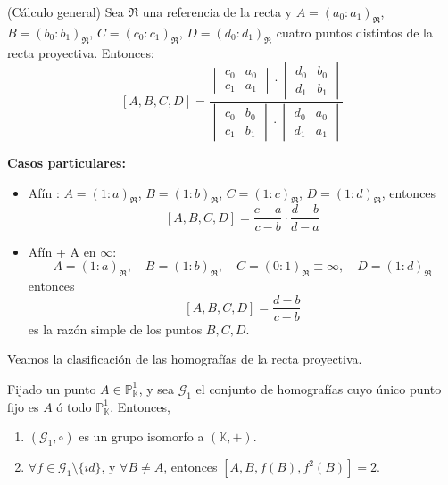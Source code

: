 \begin{lema} (Cálculo general)
    Sea $\mathfrak{R}$ una referencia de la recta y $A=(a_0:a_1)_\mathfrak{R}$, $B=(b_0:b_1)_\mathfrak{R}$, $C=(c_0:c_1)_\mathfrak{R}$, $D=(d_0:d_1)_\mathfrak{R}$ cuatro puntos distintos de la recta proyectiva. Entonces:
    \[
    \left[ A, B, C, D \right] =
    \frac{
        \begin{vmatrix}
            c_0 & a_0 \\
            c_1 & a_1
        \end{vmatrix}
        \cdot
        \begin{vmatrix}
            d_0 & b_0 \\
            d_1 & b_1
        \end{vmatrix}
    }{
        \begin{vmatrix}
            c_0 & b_0 \\
            c_1 & b_1
        \end{vmatrix}
        \cdot
        \begin{vmatrix}
            d_0 & a_0 \\
            d_1 & a_1
        \end{vmatrix}
    }
    \]
\end{lema}

\textbf{Casos particulares:}\\

\begin{itemize}
    \item Afín : $A = (1: a)_\mathfrak{R}$, $B = (1: b)_\mathfrak{R}$, $C = (1: c)_\mathfrak{R}$, $D = (1: d)_\mathfrak{R}$, entonces 
    \[
    \left[ A, B, C, D \right] =
    \frac{c - a}{c - b} \cdot \frac{d - b}{d - a}
    \]
    \item Afín + A en $\infty$:\\
    \[
        A = (1: a)_\mathfrak{R}, \quad B = (1: b)_\mathfrak{R}, \quad C = (0:1)_\mathfrak{R} \equiv \infty, \quad D = (1: d)_\mathfrak{R}
    \]
    entonces 
    \[
        [ A, B, C, D ] = \frac{d - b}{c - b}
    \]
    es la razón simple de los puntos $B,C,D$.
\end{itemize}

Veamos la clasificación de las homografías de la recta proyectiva.

\begin{proposición}
    Fijado un punto $A \in \mathbb{P}^1_{\mathbb{K}}$, y sea $\mathcal{G}_1$ el conjunto de homografías cuyo único punto fijo es $A$ ó todo $\mathbb{P}^1_{\mathbb{K}}$. Entonces, 
    \begin{enumerate}
        \item $(\mathcal{G}_1, \circ)$ es un grupo isomorfo a $(\mathbb{K}, +)$.
        \item $\forall f \in \mathcal{G}_1 \setminus \{id\}$, y $\forall B \neq A$, entonces $[A, B, f(B), f^2(B)] = 2$.
    \end{enumerate}
\end{proposición}

